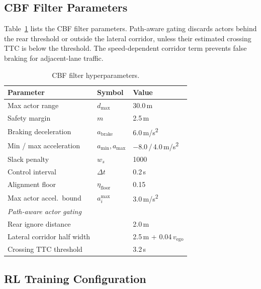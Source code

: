 \subsection{CBF Filter Parameters}

Table~\ref{tab:cbf-params} lists the CBF filter parameters. Path-aware gating discards actors behind the rear threshold or outside the lateral corridor, unless their estimated crossing TTC is below the threshold. The speed-dependent corridor term prevents false braking for adjacent-lane traffic.

\begin{table}[!htbp]
\centering
\caption{CBF filter hyperparameters.}
\label{tab:cbf-params}
{\scriptsize
\setlength{\tabcolsep}{5.5pt}
\begin{tabular}{lll}
\toprule
\textbf{Parameter} & \textbf{Symbol} & \textbf{Value} \\
\midrule
Max actor range            & $d_{\max}$        & 30.0\,m \\
Safety margin              & $m$               & 2.5\,m \\
Braking deceleration       & $a_{\text{brake}}$& 6.0\,m/s\textsuperscript{2} \\
Min / max acceleration     & $a_{\min},a_{\max}$ & $-8.0$\,/\,4.0\,m/s\textsuperscript{2} \\
Slack penalty              & $w_s$             & 1000 \\
Control interval           & $\Delta t$        & 0.2\,s \\
Alignment floor            & $\eta_{\text{floor}}$ & 0.15 \\
Max actor accel.\ bound    & $a_i^{\max}$      & 3.0\,m/s\textsuperscript{2} \\
\midrule
\multicolumn{3}{l}{\textit{Path-aware actor gating}} \\
\midrule
Rear ignore distance       &                   & 2.0\,m \\
Lateral corridor half width&                   & 2.5\,m + 0.04\,$v_{\text{ego}}$ \\
Crossing TTC threshold     &                   & 3.2\,s \\
\bottomrule
\end{tabular} }
\end{table}

\subsection{RL Training Configuration}

